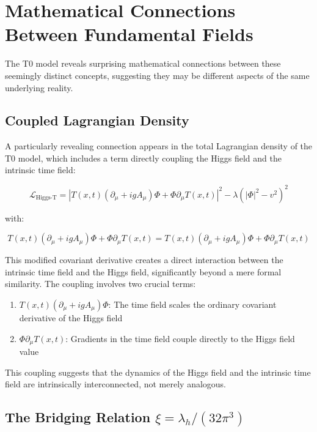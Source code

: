 \documentclass[12pt,a4paper]{article}
\newcommand{\Tfieldt}{T(x,t)}
\newcommand{\DhiggsTt}{\Tfieldt (\partial_\mu + ig A_\mu) \Phi + \Phi \partial_\mu \Tfieldt}
\begin{document}
	\section{Mathematical Connections Between Fundamental Fields}
	\label{sec:mathematical_connections}
	
	The T0 model reveals surprising mathematical connections between these seemingly distinct concepts, suggesting they may be different aspects of the same underlying reality.
	
	\subsection{Coupled Lagrangian Density}
	\label{subsec:coupled_lagrangian}
	
	A particularly revealing connection appears in the total Lagrangian density of the T0 model, which includes a term directly coupling the Higgs field and the intrinsic time field:
	
	\begin{equation}
		\mathcal{L}_{\text{Higgs-T}} = |\DhiggsTt|^2 - \lambda(|\Phi|^2 - v^2)^2
	\end{equation}
	
	with:
	
	\begin{equation}
		\DhiggsTt = \Tfieldt (\partial_\mu + ig A_\mu) \Phi + \Phi \partial_\mu \Tfieldt
	\end{equation}
	
	This modified covariant derivative creates a direct interaction between the intrinsic time field and the Higgs field, significantly beyond a mere formal similarity. The coupling involves two crucial terms:
	
	\begin{enumerate}
		\item $\Tfieldt (\partial_\mu + ig A_\mu) \Phi$: The time field scales the ordinary covariant derivative of the Higgs field
		\item $\Phi \partial_\mu \Tfieldt$: Gradients in the time field couple directly to the Higgs field value
	\end{enumerate}
	
	This coupling suggests that the dynamics of the Higgs field and the intrinsic time field are intrinsically interconnected, not merely analogous.
	
	\subsection{The Bridging Relation $\xi = \lambda_h/(32\pi^3)$}
	\label{subsec:bridging_relation}
	
\end{document}
